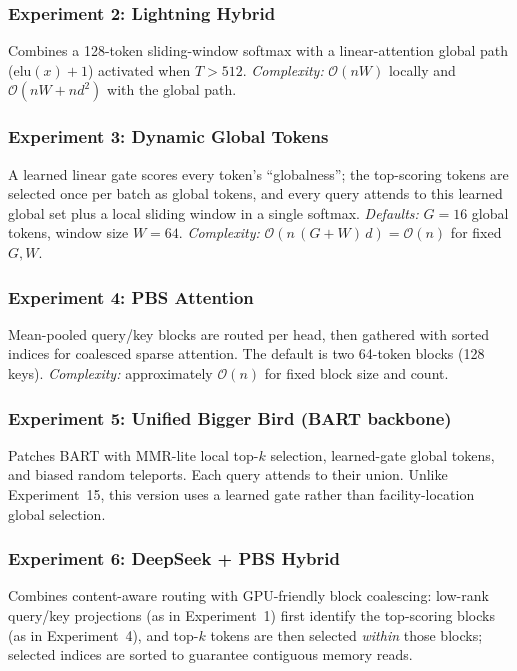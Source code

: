 \documentclass[11pt]{article}
\newcommand{\bigO}{\mathcal{O}}
\begin{document}
\subsubsection*{Experiment 2: Lightning Hybrid}
\label{exp:lightning}
Combines a 128-token sliding-window softmax with a linear-attention global
path ($\mathrm{elu}(x)+1$) activated when $T>512$. \emph{Complexity:}
$\bigO(nW)$ locally and $\bigO(nW+nd^2)$ with the global path.

\subsubsection*{Experiment 3: Dynamic Global Tokens}
\label{exp:dynglobal}
A learned linear gate scores every token's ``globalness''; the top-scoring
tokens are selected once per batch as global tokens, and every query attends
to this learned global set plus a local sliding window in a single softmax.
\emph{Defaults:} $G=16$ global tokens, window size $W=64$.
\emph{Complexity:} $\bigO(n\,(G+W)\,d) = \bigO(n)$ for fixed $G,W$.

\subsubsection*{Experiment 4: PBS Attention}
\label{exp:pbs}
Mean-pooled query/key blocks are routed per head, then gathered with sorted
indices for coalesced sparse attention. The default is two 64-token blocks
(128 keys). \emph{Complexity:} approximately $\bigO(n)$ for fixed block size
and count.

\subsubsection*{Experiment 5: Unified Bigger Bird (BART backbone)}
\label{exp:unified-bb}
Patches BART with MMR-lite local top-$k$ selection, learned-gate global tokens,
and biased random teleports. Each query attends to their union. Unlike
Experiment~15, this version uses a learned gate rather than facility-location
global selection.

\subsubsection*{Experiment 6: DeepSeek + PBS Hybrid}
\label{exp:deepseekpbs}
Combines content-aware routing with GPU-friendly block coalescing: low-rank
query/key projections (as in Experiment~1) first identify the top-scoring
blocks (as in Experiment~4), and top-$k$ tokens are then selected \emph{within}
those blocks; selected indices are sorted to guarantee contiguous memory
reads.
\end{document}
